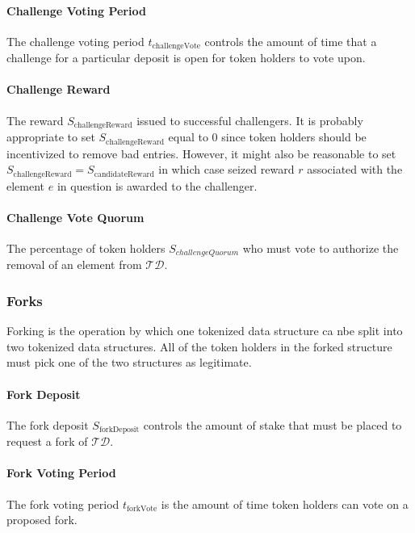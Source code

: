 \documentclass{llncs}
\begin{document}
\paragraph{Challenge Voting Period}
The challenge voting period $t_\text{challengeVote}$ controls the amount of time that a challenge for a particular deposit is open for token holders to vote upon.

\paragraph{Challenge Reward}

The reward $S_\text{challengeReward}$ issued to successful challengers. It is probably appropriate to set $S_\text{challengeReward}$ equal to $0$ since token holders should be incentivized to remove bad entries. However, it might also be reasonable to set $S_\text{challengeReward} = S_\text{candidateReward}$ in which case seized reward $r$ associated with the element $e$ in question is awarded to the challenger.

\paragraph{Challenge Vote Quorum}
The percentage of token holders $S_{challengeQuorum}$ who must vote to authorize the removal of an element from $\mathcal{TD}$.

\subsubsection{Forks}

Forking is the operation by which one tokenized data structure ca nbe split into two tokenized data structures. All of the token holders in the forked structure must pick one of the two structures as legitimate.

\paragraph{Fork Deposit}

The fork deposit $S_\text{forkDeposit}$ controls the amount of stake that must be placed to request a fork of $\mathcal{TD}$.

\paragraph{Fork Voting Period}

The fork voting period $t_\text{forkVote}$ is the amount of time token holders can vote on a proposed fork.
\end{document}
